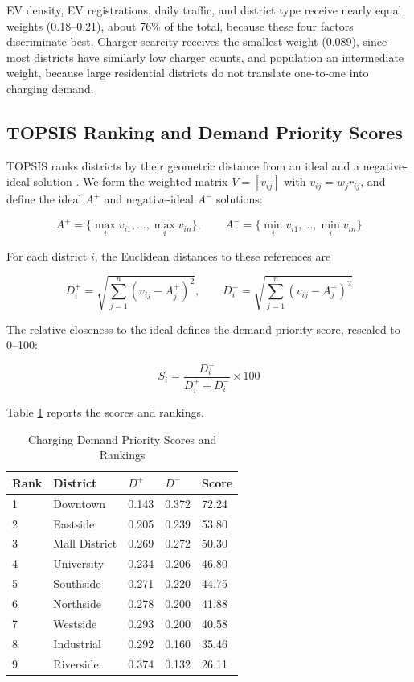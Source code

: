 \documentclass[12pt]{article}
\begin{document}
EV density, EV registrations, daily traffic, and district type receive nearly equal
weights (0.18--0.21), about 76\% of the total, because these four factors discriminate
best. Charger scarcity receives the smallest weight (0.089), since most districts have
similarly low charger counts, and population an intermediate weight, because large
residential districts do not translate one-to-one into charging demand.

\subsection{TOPSIS Ranking and Demand Priority Scores}

TOPSIS ranks districts by their geometric distance from an ideal and a negative-ideal
solution \cite{Hwang1981, Zhang2011}. We form the weighted matrix $V = [v_{ij}]$ with
$v_{ij} = w_j r_{ij}$, and define the ideal $A^+$ and negative-ideal $A^-$ solutions:

\begin{equation}
A^+ = \{\max_i v_{i1}, \dots, \max_i v_{in}\}, \qquad
A^- = \{\min_i v_{i1}, \dots, \min_i v_{in}\}
\end{equation}

For each district $i$, the Euclidean distances to these references are

\begin{equation}
D_i^+ = \sqrt{\sum_{j=1}^n (v_{ij} - A_j^+)^2}, \qquad
D_i^- = \sqrt{\sum_{j=1}^n (v_{ij} - A_j^-)^2}
\end{equation}

The relative closeness to the ideal defines the demand priority score, rescaled to 0--100:

\begin{equation}
S_i = \frac{D_i^-}{D_i^+ + D_i^-} \times 100
\end{equation}

Table \ref{tab:scores} reports the scores and rankings.

\begin{table}[H]
\centering
\caption{Charging Demand Priority Scores and Rankings}
\label{tab:scores}
\renewcommand{\arraystretch}{0.95}
\begin{tabular}{@{}p{}p{}p{}p{}p{}@{}}
\toprule
Rank & District & $D^+$ & $D^-$ & Score \\
\midrule
1 & Downtown & 0.143 & 0.372 & 72.24 \\
2 & Eastside & 0.205 & 0.239 & 53.80 \\
3 & Mall District & 0.269 & 0.272 & 50.30 \\
4 & University & 0.234 & 0.206 & 46.80 \\
5 & Southside & 0.271 & 0.220 & 44.75 \\
6 & Northside & 0.278 & 0.200 & 41.88 \\
7 & Westside & 0.293 & 0.200 & 40.58 \\
8 & Industrial & 0.292 & 0.160 & 35.46 \\
9 & Riverside & 0.374 & 0.132 & 26.11 \\
\bottomrule
\end{tabular}
\end{table}
\end{document}
